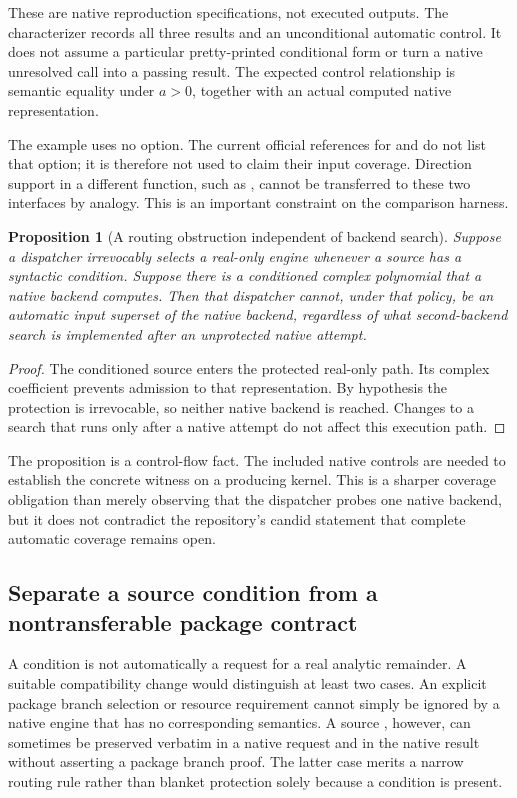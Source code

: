 \documentclass[11pt,letterpaper]{article}
\newtheorem{proposition}{Proposition}[section]
\theoremstyle{definition}\newtheorem{definition}[proposition]{Definition}
\begin{document}
These are native reproduction specifications, not executed outputs. The
characterizer records all three results and an unconditional automatic control.
It does not assume a particular pretty-printed conditional form or turn a
native unresolved call into a passing result. The expected control relationship
is semantic equality under $a>0$, together with an actual computed native
representation.

The example uses no  option. The current official references
for  and  do not list that option; it is therefore
not used to claim their input coverage. Direction support in a different
function, such as , cannot be transferred to these two
interfaces by analogy. This is an important constraint on the comparison
harness.\cite{wlseries,wlasymptotic,wlasymptoticsolve}

\begin{proposition}[A routing obstruction independent of backend search]
Suppose a dispatcher irrevocably selects a real-only engine whenever a source
has a syntactic condition. Suppose there is a conditioned complex polynomial
that a native backend computes. Then that dispatcher cannot, under that policy,
be an automatic input superset of the native backend, regardless of what
second-backend search is implemented after an unprotected native attempt.
\end{proposition}
\begin{proof}
The conditioned source enters the protected real-only path. Its complex
coefficient prevents admission to that representation. By hypothesis the
protection is irrevocable, so neither native backend is reached. Changes to a
search that runs only after a native attempt do not affect this execution path.
\end{proof}

The proposition is a control-flow fact. The included native controls are needed
to establish the concrete witness on a producing kernel. This is a sharper
coverage obligation than merely observing that the dispatcher probes one native
backend, but it does not contradict the repository's candid statement that
complete automatic coverage remains open.

\subsection{Separate a source condition from a nontransferable package contract}
A condition is not automatically a request for a real analytic remainder.
A suitable compatibility change would distinguish at least two cases.
An explicit package branch selection or resource requirement cannot simply be
ignored by a native engine that has no corresponding semantics. A source
, however, can sometimes be preserved verbatim in
a native request and in the native result without asserting a package branch
proof. The latter case merits a narrow routing rule rather than blanket
protection solely because a condition is present.
\end{document}
